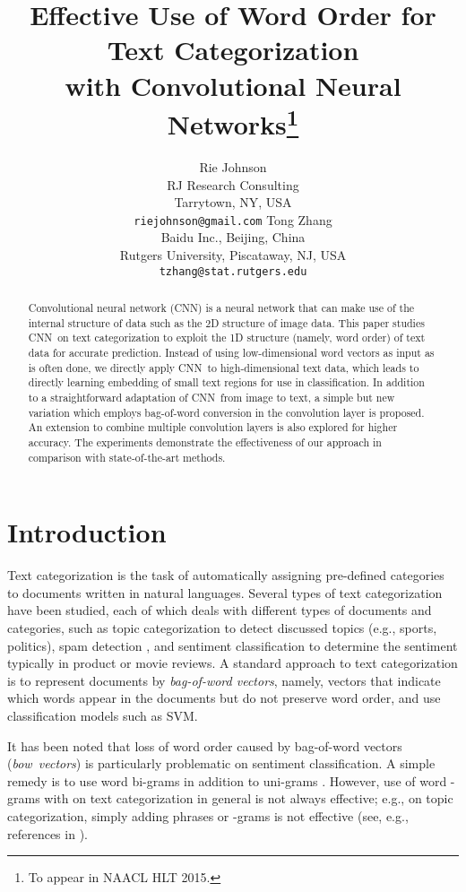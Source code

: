\documentclass[11pt,letterpaper]{article}
\title{Effective Use of Word Order for Text Categorization \\ with Convolutional Neural Networks\thanks{
To appear in NAACL HLT 2015. 
}}
\author{Rie Johnson\\
	    RJ Research Consulting\\
	    Tarrytown, NY, USA\\
	    {\tt riejohnson@gmail.com}
	  \And
	Tong Zhang\\
    Baidu Inc., Beijing, China \\    
    Rutgers University, Piscataway, NJ, USA \\
  {\tt tzhang@stat.rutgers.edu}
}
\date{}
\newcommand{\cnn}{CNN}
\newcommand{\bow}{{bow}}
\begin{document}
\maketitle
\begin{abstract}
Convolutional neural network (\cnn) is a neural network that can make use of 
the internal structure of data such as the 2D structure of image data.  
This paper studies \cnn\ on text categorization to exploit
the 1D structure (namely, word order) of text data for accurate prediction.  
Instead of using low-dimensional word vectors as input as is often done, 
we directly apply \cnn\ to high-dimensional text data, which leads to 
directly learning embedding of small text regions for use in classification.  
In addition to a straightforward adaptation of \cnn\ from image to text, 
a simple but new variation which employs bag-of-word conversion in the 
convolution layer is proposed.  
An extension to combine multiple convolution layers is also explored for higher 
accuracy.    
The experiments demonstrate the effectiveness of our approach in comparison with 
state-of-the-art methods.


\end{abstract}

\section{Introduction}

Text categorization is the task of automatically assigning pre-defined categories to 
documents written in natural languages.  
Several types of text categorization have been studied, each of which deals with 
different types of documents and categories, 
such as topic categorization to detect discussed topics (e.g., sports, politics), 
spam detection \cite{SDHH98}, and sentiment classification \cite{PLV02,PL08,MDPHNP11} 
to determine the sentiment typically in product or movie reviews.  
A standard approach to text categorization 
is to represent documents by {\em bag-of-word vectors}, 
namely, vectors that indicate which words appear in the documents but do not preserve
word order, and use classification models such as SVM. 

It has been noted that loss of word order caused by bag-of-word vectors 
({\em \bow\ vectors}) is particularly problematic on sentiment classification.  
A simple remedy is to use word bi-grams in addition to uni-grams 
\cite{BDP07,GBB11,WM12}. 
However, 
use of word -grams with  on text categorization in general is not always 
effective; e.g.,   
on topic categorization, simply adding phrases or -grams 
is not effective (see, e.g., references in \cite{TWL02}).  
\end{document}
